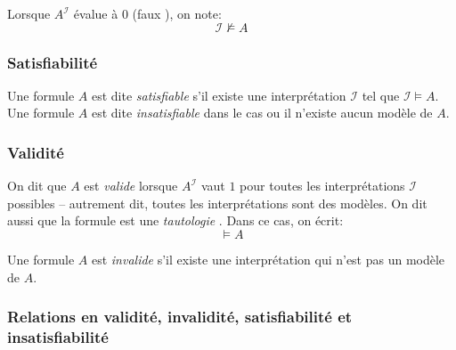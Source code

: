 Lorsque $A^{\mathcal{I}}$ évalue à $0$ (\og faux \fg), on note:
\[
\mathcal{I} \not\vDash A
\]

\subsubsection{Satisfiabilité}

Une formule $A$ est dite \og \textit{satisfiable} \fg{} s'il existe une interprétation $\mathcal{I}$ tel que $\mathcal{I} \vDash A$.
Une formule $A$ est dite \og \textit{insatisfiable} \fg{} dans le cas ou il n'existe aucun modèle de $A$. 

\subsubsection{Validité}

On dit que $A$ est \og \textit{valide} \fg{} lorsque $A^{\mathcal{I}}$ vaut $1$ pour toutes les interprétations $\mathcal{I}$ possibles – autrement dit, toutes les interprétations sont des modèles.
On dit aussi que la formule est une \og \textit{tautologie} \fg{}.
Dans ce cas, on écrit:
\[
\vDash A
\]

Une formule $A$ est \og \textit{invalide} \fg{} s'il existe une interprétation qui n'est pas un modèle de $A$.

\subsubsection{Relations en validité, invalidité, satisfiabilité et insatisfiabilité}


